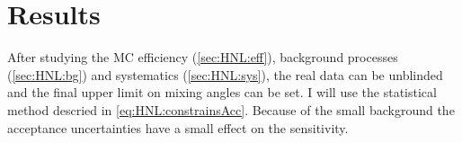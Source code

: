 \documentclass[../main.tex]{subfiles}
\begin{document}
\section{Results}
\label{sec:HNL:MCres}

After studying the MC efficiency (\autoref{sec:HNL:eff}), background processes (\autoref{sec:HNL:bg}) and systematics (\autoref{sec:HNL:sys}), the real data can be unblinded and the final upper limit on mixing angles can be set. I will use the statistical method descried in \autoref{eq:HNL:constrainsAcc}. Because of the small background the acceptance uncertainties have a small effect on the sensitivity.

\begin{comment}
\begin{figure}[!ht]
    \begin{center}
  \begin{minipage}{0.49\linewidth}
    \centering{\texttt{[image: Ue2fullMC]}  \\  $K^+\to e(e\pi)$}
  \end{minipage}
  \hfill
  \begin{minipage}{0.49\linewidth}
    \centering{\texttt{[image: Umu2fullMC]}  \\  $K^+\to \mu(\mu\pi)$}
  \end{minipage}
  \caption{Sensitivity to mixing elements $\left|Ue\right|^2, \left|U\mu\right|^2$ based on MC samples analysis}
  \label{fig:HNL:LimitsMC1}
    \end{center}
\end{figure}

\begin{figure}[!ht]
    \begin{center}
  \begin{minipage}{0.49\linewidth}
    \centering{\texttt{[image: UeUmufullMC]}  \\  $K^+\to \mu(e\pi)$ and $K^+\to e(\mu\pi)$}
  \end{minipage}
  \begin{minipage}{0.49\linewidth}
    \centering{\texttt{[image: UeMixfullMC]}  \\  $K^+\to e(\mu\mu\nu)$}
  \end{minipage}
  \caption{Sensitivity to mixing elements $\left|UeU\mu\right|$ and $\left|U_{e}\right|\sqrt{\left|U_{e}\right|^2+\left|U_{\tau}\right|^2}$ based on MC samples analysis.}
  \label{fig:HNL:LimitsMC2}
  \end{center}
\end{figure}

As one can see the improvements of PS191 limits can be obtained with the current statistics.

\section{Data unblinding}
\end{comment}
\end{document}
